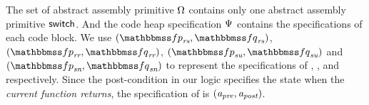 The set of abstract assembly primitive $\Omega$
contains only one abstract assembly primitive $\mathsf{switch}$.
And the code heap specification $\Psi{}$
contains the specifications of each code block.
We use
$(\relspecpre_{\textit{rs}}, \relspecpost_{\textit{rs}})$,
$(\relspecpre_{\textit{rr}}, \relspecpost_{\textit{rr}})$,
$(\relspecpre_{\textit{su}}, \relspecpost_{\textit{su}})$ and
$(\relspecpre_{\textit{sn}}, \relspecpost_{\textit{sn}})$
to represent the specifications of
\regsave{}, \regrestore{},
\SaveUsedWin{} and \SwitchNewTask{} respectively.
Since the post-condition in our logic specifies the
state when the \textit{current function returns},
the specification of \SwitchEntry{} is $(\textit{a}_\textit{pre}, \textit{a}_\textit{post})$.

